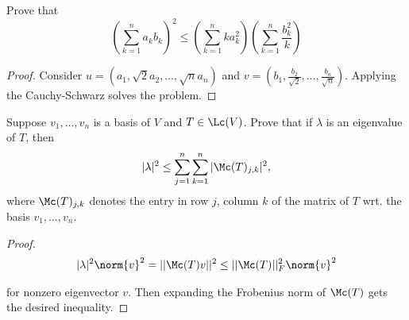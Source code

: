 \documentclass{extarticle}
\begin{document}
\begin{problem}{17}
    Prove that
    \[\left(\sum_{k=1}^{n} a_k b_k \right)^2 \leq \left(\sum_{k=1}^{n} k a_k^2\right) \left(\sum_{k=1}^{n} \frac{b_k^2}{k}\right)\]
\end{problem}

\begin{proof}
Consider \(u = (a_1, \sqrt{2}a_2, \ldots, \sqrt{n}a_n)\) and
\(v = \left(b_1, \frac{b_2}{\sqrt{2}}, \ldots, \frac{b_n}{\sqrt{n}}\right)\). Applying the Cauchy-Schwarz solves the problem.
\end{proof}




\begin{problem}{19}
    Suppose \(v_1, \ldots, v_n\) is a basis of \(V\) and \(T \in \Lc(V)\). Prove that
    if \(\lambda\) is an eigenvalue of \(T\), then
    \[|\lambda|^2 \leq \sum_{j=1}^{n} \sum_{k=1}^{n} |\Mc(T)_{j,k}|^2,\]
    where \(\Mc(T)_{j,k}\) denotes the entry in row \(j\), column \(k\) of the matrix of \(T\)
    wrt. the basis \(v_1, \ldots, v_n\).
\end{problem}

\begin{proof}


\begin{align*}
    |\lambda|^2 \norm{v}^2 = || \Mc(T) v ||^2 \leq || \Mc(T) ||_F^2 \norm{v}^2
\end{align*}

for nonzero eigenvector \(v\). Then expanding the Frobenius norm of \(\Mc(T)\) gets the desired inequality.
\end{proof}
\end{document}
